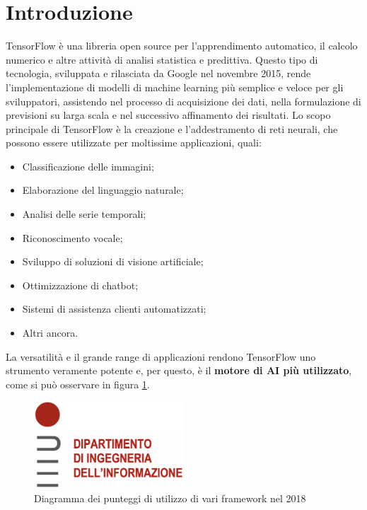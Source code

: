 \section{Introduzione}
TensorFlow è una libreria open source per l'apprendimento automatico, il calcolo numerico e altre attività di analisi statistica e predittiva. Questo
tipo di tecnologia, sviluppata e rilasciata da Google nel novembre 2015, rende l’implementazione di modelli di machine learning più semplice e veloce per
gli sviluppatori, assistendo nel processo di acquisizione dei dati, nella formulazione di previsioni su larga scala e nel successivo affinamento dei risultati.
Lo scopo principale di TensorFlow è la creazione e l’addestramento di reti neurali, che possono essere utilizzate per moltissime applicazioni, quali:
\begin{itemize}
    \item Classificazione delle immagini;
    \item Elaborazione del linguaggio naturale;
    \item Analisi delle serie temporali;
    \item Riconoscimento vocale;
    \item Sviluppo di soluzioni di visione artificiale;
    \item Ottimizzazione di chatbot;
    \item Sistemi di assistenza clienti automatizzati;
    \item Altri ancora.
\end{itemize}

La versatilità e il grande range di applicazioni rendono TensorFlow uno strumento veramente potente e, per questo, è il \textbf{motore di AI più utilizzato},
come si può osservare in figura \ref{fig:diagramma}.

\begin{figure}
    \centering
    \includegraphics[width=0.5\textwidth]{Immagini/logo_dei.png}
    \caption{Diagramma dei punteggi di utilizzo di vari framework nel 2018}
    \label{fig:diagramma}
\end{figure}

